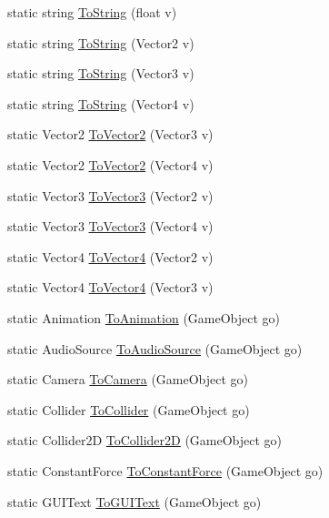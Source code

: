 \begin{DoxyCompactItemize}
static string \hyperlink{classi_c_s___type_casts_a61cd8b127e3ca63fb5575f46480299fc}{To\+String} (float v)
\item 
static string \hyperlink{classi_c_s___type_casts_a2f303312ba748dc777ea1680ee3ed434}{To\+String} (Vector2 v)
\item 
static string \hyperlink{classi_c_s___type_casts_a2afc7f44ce2f692ac7fbbc50038c8c71}{To\+String} (Vector3 v)
\item 
static string \hyperlink{classi_c_s___type_casts_a9ae3c15543fc4601ab41c8470abc2a5a}{To\+String} (Vector4 v)
\item 
static Vector2 \hyperlink{classi_c_s___type_casts_a43d444394208b0e18504bd86e58afe76}{To\+Vector2} (Vector3 v)
\item 
static Vector2 \hyperlink{classi_c_s___type_casts_acdaec668fd0f28c08193afb8eee36649}{To\+Vector2} (Vector4 v)
\item 
static Vector3 \hyperlink{classi_c_s___type_casts_a4cc3ce4090ff9aa3e5f036fbd58ac84c}{To\+Vector3} (Vector2 v)
\item 
static Vector3 \hyperlink{classi_c_s___type_casts_ac3d4c0f0f8c379ae30bdf56a1bfb85b3}{To\+Vector3} (Vector4 v)
\item 
static Vector4 \hyperlink{classi_c_s___type_casts_a25951adbb16fbda238e7309d94455150}{To\+Vector4} (Vector2 v)
\item 
static Vector4 \hyperlink{classi_c_s___type_casts_a46df74f91762794c4f657d436f4495cd}{To\+Vector4} (Vector3 v)
\item 
static Animation \hyperlink{classi_c_s___type_casts_ad716972e6c2811790c45effe97301c99}{To\+Animation} (Game\+Object go)
\item 
static Audio\+Source \hyperlink{classi_c_s___type_casts_a2341df1a54a4dbc2e83018f44af2982e}{To\+Audio\+Source} (Game\+Object go)
\item 
static Camera \hyperlink{classi_c_s___type_casts_a02b59f264564e906a85d6409ecaf3dfd}{To\+Camera} (Game\+Object go)
\item 
static Collider \hyperlink{classi_c_s___type_casts_ad8b7e7974e1d0937c3f3ee5bc3c400db}{To\+Collider} (Game\+Object go)
\item 
static Collider2\+D \hyperlink{classi_c_s___type_casts_ab40d3a2778cd9dc05bf895c9b67c25b1}{To\+Collider2\+D} (Game\+Object go)
\item 
static Constant\+Force \hyperlink{classi_c_s___type_casts_a0db52b820c7413a81a710678019d9ea7}{To\+Constant\+Force} (Game\+Object go)
\item 
static G\+U\+I\+Text \hyperlink{classi_c_s___type_casts_ab66051eb71774ffb1e2240cd4e6a48dc}{To\+G\+U\+I\+Text} (Game\+Object go)

\end{DoxyCompactItemize}
